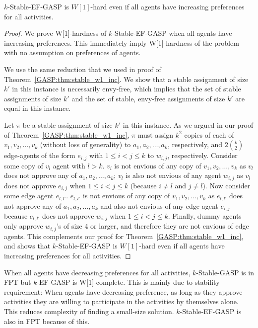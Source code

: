 \begin{theorem} \label{GASP:thm:stable_ef_gasp_w1}
$k$-Stable-EF-GASP is $W[1]$-hard even if all agents have increasing preferences for all activities.
\end{theorem}
\begin{proof}
	We prove W[1]-hardness of $k$-Stable-EF-GASP when all agents have increasing preferences. This immediately imply W[1]-hardness of the problem with no assumption on preferences of agents.
	
	We use the same reduction that we used in proof of Theorem~\ref{GASP:thm:stable_w1_inc}. We show that a stable assignment of size $k'$ in this instance is necessarily envy-free, which implies that the set of stable assignments of size $k'$ and the set of stable, envy-free assignments of size $k'$ are equal in this instance. 

	Let $\pi$ be a stable assignment of size $k'$ in this instance.
	As we argued in our proof of Theorem~\ref{GASP:thm:stable_w1_inc}, $\pi$ must assign $k^2$ copies of each of $v_1, v_2, \dots, v_k$ (without loss of generality) to $a_1, a_2, \dots, a_k$, respectively, and $2\binom{k}{2}$ edge-agents of the form $e_{i,j}$ with $1\leq i < j \leq k$ to $w_{i,j}$, respectively. Consider some copy of $v_l$ agent with $l > k$. $v_l$ is not envious of any copy of $v_1, v_2, \dots, v_k$ as $v_l$ does not approve any of $a_1, a_2, \dots, a_k$; $v_l$ is also not envious of any agent $w_{i,j}$ as $v_l$ does not approve $e_{i,j}$ when $1 \leq i < j \leq k$ (because $i\neq l$ and $j\neq l$). Now consider some edge agent $e_{l, l'}$. $e_{l, l'}$ is not envious of any copy of $v_1, v_2, \dots, v_k$ as $e_{l, l'}$ does not approve any of $a_1, a_2, \dots, a_k$ and also not envious of any edge agent $e_{i,j}$ because $e_{l, l'}$ does not approve $w_{i,j}$ when $1 \leq i < j \leq k$. Finally, dummy agents only approve $w_{i,j}$'s of size $4$ or larger, and therefore they are not envious of edge agents. This complements our proof for Theorem~\ref{GASP:thm:stable_w1_inc}, and shows that $k$-Stable-EF-GASP is $W[1]$-hard even if all agents have increasing preferences for all activities. 
\end{proof}


When all agents have decreasing preferences for all activities, $k$-Stable-GASP is in FPT but $k$-EF-GASP is W[1]-complete. This is mainly due to stability requirement: When agents have decreasing preference, as long as they approve activities they are willing to participate in the activities by themselves alone. This reduces complexity of finding a small-size solution. $k$-Stable-EF-GASP is also in FPT because of this.


